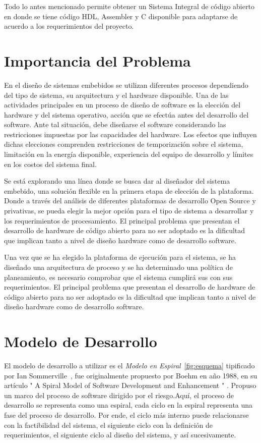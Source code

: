 Todo lo antes mencionado permite obtener un Sistema Integral de código abierto en donde se tiene código HDL, Assembler y C disponible para adaptarse
de acuerdo a los requerimientos del proyecto. 

\section{Importancia del Problema}
En el diseño de sistemas embebidos se utilizan diferentes procesos dependiendo del tipo de sistema, su arquitectura y el hardware disponible. Una de
las actividades principales en un proceso de diseño de software es la elección del hardware y del sistema operativo, acción que se efectúa antes del
desarrollo del software. Ante tal situación, debe diseñarse el software considerando las restricciones impuestas por las capacidades del hardware.
Los efectos que influyen dichas elecciones comprenden restricciones de temporización sobre el sistema, limitación en la energía disponible,
experiencia del equipo de desarrollo y límites en los costos del sistema final.

Se está explorando una línea donde se busca dar al diseñador del sistema embebido, una solución flexible en la primera etapa de elección de
la plataforma. Donde a través del análisis de diferentes plataformas de desarrollo Open Source y privativas, se pueda elegir la mejor opción para el
tipo de sistema a desarrollar y los requerimientos de procesamiento. El principal problema que presentan el desarrollo de hardware de código abierto para
no ser adoptado es la dificultad que implican tanto a nivel de diseño hardware como de desarrollo software. 

Una vez que se ha elegido la plataforma de ejecución para el sistema, se ha diseñado una arquitectura de proceso y se ha determinado una política de
planeamiento, es necesario comprobar que el sistema cumplirá sus con sus requerimientos. El principal problema que presentan el desarrollo de
hardware de código abierto para no ser adoptado es la dificultad que implican tanto a nivel de diseño hardware como de desarrollo software.

\section{Modelo de Desarrollo}
El modelo de desarrollo a utilizar es el \textit{Modelo en Espiral}~\ref{fig:esquema} tipificado por Ian Sommerville~\cite{Etiqueta00}, fue
originalmente propuesto por Boehm en año 1988, en su artículo " A Spiral Model of Software Development and Enhancement " . Propuso un marco del
proceso de software dirigido por el riesgo.Aquí, el proceso de desarrollo se representa como una espiral, cada ciclo en la espiral representa una
fase del proceso de desarrollo. Por ende, el ciclo más interno puede relacionarse con la factibilidad del sistema, el siguiente ciclo con la
definición de requerimientos, el siguiente ciclo al diseño del sistema, y así sucesivamente. 

